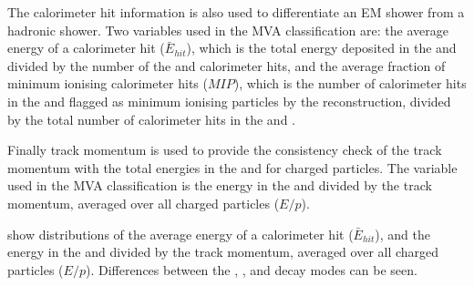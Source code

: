 The calorimeter hit information is also used to  differentiate an EM shower from a hadronic shower. Two variables used in the MVA classification are: the average energy of a calorimeter hit ($\bar{E}_{hit}$), which is the total energy deposited in the \ECAL and \HCAL divided by the number of the \ECAL and \HCAL calorimeter hits, and the average fraction of minimum ionising calorimeter hits ($MIP$), which is the number of calorimeter hits in the \ECAL and \HCAL flagged as minimum ionising particles by the \pandora reconstruction, divided by the total number of calorimeter hits in the \ECAL and \HCAL.

Finally track momentum is used to provide the consistency check of the track momentum with the total energies in the \ECAL and \HCAL for charged particles. The variable used in the MVA classification is the energy in the \ECAL and \HCAL divided by the track momentum, averaged over all charged particles ($E/p$).


 show distributions of the average energy of a calorimeter hit ($\bar{E}_{hit}$), and the energy in the \ECAL and \HCAL divided by the track momentum, averaged over all charged particles ($E/p$). Differences between the \decayElectron, \decayMuon, and \decayPion decay modes can be seen.





